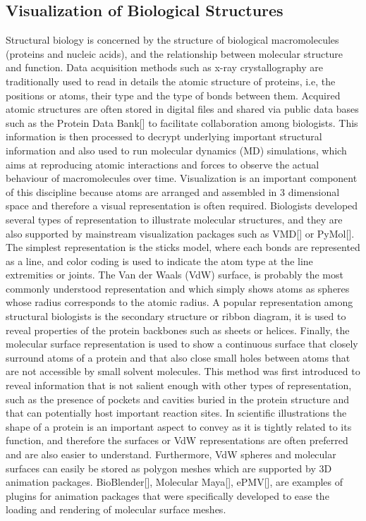 \subsection{Visualization of Biological Structures}

Structural biology is concerned by the structure of biological macromolecules (proteins and nucleic acids), and the relationship between molecular structure and function.
Data acquisition methods such as x-ray crystallography are traditionally used to read in details the atomic structure of proteins, i.e, the positions or atoms, their type and the type of bonds between them.
Acquired atomic structures are often stored in digital files and shared via public data bases such as the Protein Data Bank[] to facilitate collaboration among biologists.
This information is then processed to decrypt underlying important structural information and also used to run molecular dynamics (MD) simulations, which aims at reproducing atomic interactions and forces to observe the actual behaviour of macromolecules over time.
Visualization is an important component of this discipline because atoms are arranged and assembled in 3 dimensional space and therefore a visual representation is often required.
Biologists developed several types of representation to illustrate molecular structures, and they are also supported by mainstream visualization packages such as VMD[] or PyMol[].
The simplest representation is the sticks model, where each bonds are represented as a line, and color coding is used to indicate the atom type at the line extremities or joints.
The Van der Waals (VdW) surface, is probably the most commonly understood representation and which simply shows atoms as spheres whose radius corresponds to the atomic radius.
A popular representation among structural biologists is the secondary structure or ribbon diagram, it is used to reveal properties of the protein backbones such as sheets or helices.
Finally, the molecular surface representation is used to show a continuous surface that closely surround atoms of a protein and that also close small holes between atoms that are not accessible by small solvent molecules.
This method was first introduced to reveal information that is not salient enough with other types of representation, such as the presence of pockets and cavities buried in the protein structure and that can potentially host important reaction sites.
In scientific illustrations the shape of a protein is an important aspect to convey as it is tightly related to its function, and therefore the surfaces or VdW representations are often preferred and are also easier to understand.
Furthermore, VdW spheres and molecular surfaces can easily be stored as polygon meshes which are supported by 3D animation packages.
BioBlender[], Molecular Maya[], ePMV[], are examples of plugins for animation packages that were specifically developed to ease the loading and rendering of molecular surface meshes.

